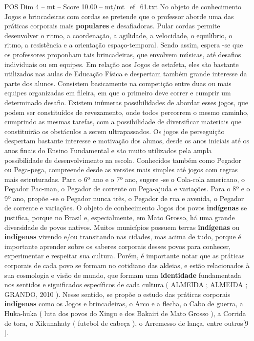 \begin{textsample}{POS Dim 4 – mt – Score 10.00 – mt/mt\_ef\_61.txt}  \label{ex:f4_pos_178}
No objeto de conhecimento Jogos e brincadeiras com cordas se pretende que o professor aborde uma das práticas corporais mais \textbf{populares} e desafiadoras.
Pular cordas permite desenvolver o ritmo, a coordenação, a agilidade, a velocidade, o equilíbrio, o ritmo, a resistência e a orientação espaço-temporal.
Sendo assim, espera -se que os professores proponham tais brincadeiras, que envolvem músicas, até desafios individuais ou em equipes.
Em relação aos Jogos de estafeta, eles são bastante utilizados nas aulas de Educação Física e despertam também grande interesse da parte dos alunos.
Consistem basicamente na competição entre duas ou mais equipes organizadas em fileira, em que o primeiro deve correr e cumprir um determinado desafio.
Existem inúmeras possibilidades de abordar esses jogos, que podem ser constituídos de revezamento, onde todos percorrem o mesmo caminho, cumprindo as mesmas tarefas, com a possibilidade de diversificar materiais que constituirão os obstáculos a serem ultrapassados.
Os jogos de perseguição despertam bastante interesse e motivação dos alunos, desde os anos iniciais até os anos finais do Ensino Fundamental e são muito utilizados pela ampla possibilidade de desenvolvimento na escola.
Conhecidos também como Pegador ou Pega-pega, compreende desde as versões mais simples até jogos com regras mais estruturadas.
Para o 6º ano e o 7º ano, sugere -se o Cola-cola americano, o Pegador Pac-man, o Pegador de corrente ou Pega-ajuda e variações.
Para o 8º e o 9º ano, propõe -se o Pegador nunca três, o Pegador de rua e avenida, o Pegador de corrente e variações.
O objeto de conhecimento Jogos dos povos \textbf{indígenas} se justifica, porque no Brasil e, especialmente, em Mato Grosso, há uma grande diversidade de povos nativos.
Muitos municípios possuem terras \textbf{indígenas} ou \textbf{indígenas} vivendo e/ou transitando nas cidades, mas acima de tudo, porque é importante aprender sobre os saberes corporais desses povos para conhecer, experimentar e respeitar sua cultura.
Porém, é importante notar que as práticas corporais de cada povo se formam no cotidiano das aldeias, e estão relacionados à sua cosmologia e visão de mundo, que formam uma \textbf{identidade} fundamentada nos sentidos e significados específicos de cada cultura ( ALMEIDA ; ALMEIDA ; GRANDO, 2010 ).
Nesse sentido, se propõe o estudo das práticas corporais \textbf{indígenas} como os Jogos e brincadeiras, o Arco e a flecha, o Cabo de guerra, a Huka-huka ( luta dos povos do Xingu e dos Bakairi de Mato Grosso ), a Corrida de tora, o Xikunahaty ( futebol de cabeça ), o Arremesso de lança, entre outros[9 ].

\end{textsample}
